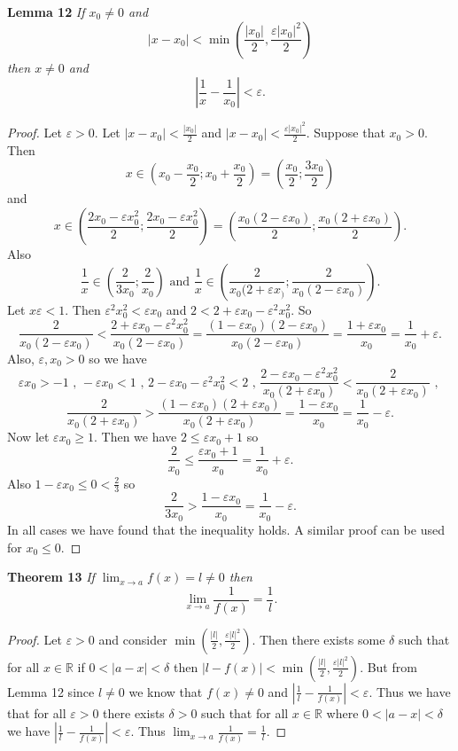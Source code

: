 \documentclass{article}
\begin{document}
\begin{flushleft}
\textbf{Lemma 12}
\textsl{If $x_0 \neq 0$ and
\[
|x-x_0| < \min \left(\frac{|x_0|}{2}, \frac{\varepsilon |x_0|^2}{2} \right)
\]
then $x \neq 0$ and
\[
\left | \frac{1}{x} - \frac{1}{x_0} \right | < \varepsilon.
\]}
\begin{proof}
Let $\varepsilon > 0$. Let $|x-x_0| < \frac{|x_0|}{2}$ and $|x-x_0| < \frac{\varepsilon |x_0|^2}{2}$. Suppose that $x_0 > 0$. Then
\[
x \in (x_0 - \frac{x_0}{2} ; x_0 + \frac{x_0}{2})=(\frac{x_0}{2} ; \frac{3x_0}{2})
\]
and
\[
x \in (\frac{2x_0 - \varepsilon x_0^2}{2} ; \frac{2x_0 - \varepsilon x_0^2}{2}) = (\frac{x_0(2-\varepsilon x_0)}{2} ; \frac{x_0(2 + \varepsilon x_0)}{2}).
\]
Also
\[
\frac{1}{x} \in (\frac{2}{3x_0} ; \frac{2}{x_0}) \text{ and } \frac{1}{x} \in (\frac{2}{x_0(2+\varepsilon x_)} ; \frac{2}{x_0(2-\varepsilon x_0)}).
\]
Let $x\varepsilon < 1$. Then $\varepsilon^2 x_0^2 < \varepsilon x_0$ and $2 < 2 + \varepsilon x_0 - \varepsilon^2 x_0^2$. So
\[
\frac{2}{x_0(2-\varepsilon x_0)} < \frac{2+\varepsilon x_0 - \varepsilon^2 x_0^2}{x_0(2 - \varepsilon x_0)}=\frac{(1-\varepsilon x_0)(2-\varepsilon x_0)}{x_0 (2-\varepsilon x_0)}=\frac{1+\varepsilon x_0}{x_0}=\frac{1}{x_0} + \varepsilon.
\]
Also, $\varepsilon, x_0 > 0$ so we have
\[
\varepsilon x_0 > -1 \text{ , } -\varepsilon x_0 < 1 \text{ , } 2 - \varepsilon x_0 - \varepsilon^2 x_0^2 < 2 \text{ , } \frac{2-\varepsilon x_0 - \varepsilon^2 x_0^2}{x_0 (2+\varepsilon x_0)} < \frac{2}{x_0 (2+\varepsilon x_0)} \text{ , }
\]
\[
\frac{2}{x_0(2+\varepsilon x_0)} > \frac{(1-\varepsilon x_0)(2+\varepsilon x_0)}{x_0(2+ \varepsilon x_0)} = \frac{1-\varepsilon x_0}{x_0}=\frac{1}{x_0} - \varepsilon.
\]
Now let $\varepsilon x_0 \geq 1$. Then we have $2 \leq \varepsilon x_0 + 1$ so
\[
\frac{2}{x_0} \leq \frac{\varepsilon x_0 + 1}{x_0} = \frac{1}{x_0} + \varepsilon.
\]
Also $1-\varepsilon x_0 \leq 0 < \frac{2}{3}$ so
\[
\frac{2}{3 x_0} > \frac{1-\varepsilon x_0}{x_0} = \frac{1}{x_0} - \varepsilon.
\]
In all cases we have found that the inequality holds. A similar proof can be used for $x_0 \leq 0$.
\end{proof}

\textbf{Theorem 13}
\textsl{If $\lim_{x \rightarrow a} f(x) = l \neq 0$ then
\[
\lim_{x \rightarrow a} \frac{1}{f(x)} = \frac{1}{l}.
\]}
\begin{proof}
Let $\varepsilon > 0$ and consider $\min \left(\frac{|l|}{2}, \frac{\varepsilon |l|^2}{2} \right)$. Then there exists some $\delta$ such that for all $x \in \mathbb{R}$ if $0 < |a - x| < \delta$ then $|l - f(x)| < \min \left(\frac{|l|}{2}, \frac{\varepsilon |l|^2}{2} \right)$. But from Lemma 12 since $l \neq 0$ we know that $f(x) \neq 0$ and $\left |\frac{1}{l}-\frac{1}{f(x)} \right | < \varepsilon$. Thus we have that for all $\varepsilon > 0$ there exists $\delta > 0$ such that for all $x \in \mathbb{R}$ where $0 < |a-x| < \delta$ we have $|\frac{1}{l}-\frac{1}{f(x)}| < \varepsilon$. Thus $\lim_{x \rightarrow a} \frac{1}{f(x)} = \frac{1}{l}$.
\end{proof}


\end{flushleft}
\end{document}

